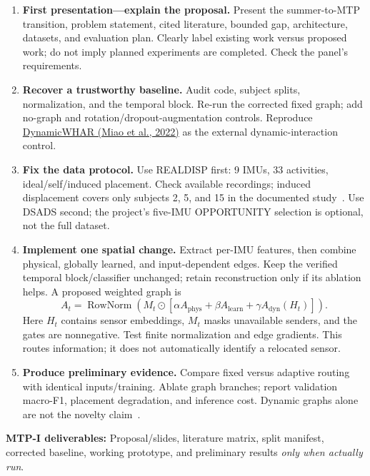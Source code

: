 \documentclass[10pt]{article}
\begin{document}
\begin{enumerate}[itemsep=3pt]
\item \textbf{First presentation---explain the proposal.} Present the summer-to-MTP transition, problem statement, cited literature, bounded gap, architecture, datasets, and evaluation plan. Clearly label existing work versus proposed work; do not imply planned experiments are completed. Check the panel's requirements.
\item \textbf{Recover a trustworthy baseline.} Audit code, subject splits, normalization, and the temporal block. Re-run the corrected fixed graph; add no-graph and rotation/dropout-augmentation controls. Reproduce \href{https://github.com/wdkhuans/DynamicWHAR}{DynamicWHAR (Miao et al., 2022)} as the external dynamic-interaction control.
\item \textbf{Fix the data protocol.} Use REALDISP first: 9 IMUs, 33 activities, ideal/self/induced placement. Check available recordings; induced displacement covers only subjects 2, 5, and 15 in the documented study~\cite{banos}. Use DSADS second; the project's five-IMU OPPORTUNITY selection is optional, not the full dataset.
\item \textbf{Implement one spatial change.} Extract per-IMU features, then combine physical, globally learned, and input-dependent edges. Keep the verified temporal block/classifier unchanged; retain reconstruction only if its ablation helps. A proposed weighted graph is
\[
 A_t=\operatorname{RowNorm}\!\left(M_t\odot
 [\alpha A_{\mathrm{phys}}+\beta A_{\mathrm{learn}}+\gamma A_{\mathrm{dyn}}(H_t)]\right).
\]
Here $H_t$ contains sensor embeddings, $M_t$ masks unavailable senders, and the gates are nonnegative. Test finite normalization and edge gradients. This routes information; it does not automatically identify a relocated sensor.
\item \textbf{Produce preliminary evidence.} Compare fixed versus adaptive routing with identical inputs/training. Ablate graph branches; report validation macro-F1, placement degradation, and inference cost. Dynamic graphs alone are not the novelty claim~\cite{decompose}.
\end{enumerate}
\textbf{MTP-I deliverables:} Proposal/slides, literature matrix, split manifest, corrected baseline, working prototype, and preliminary results \emph{only when actually run}.
\end{document}
